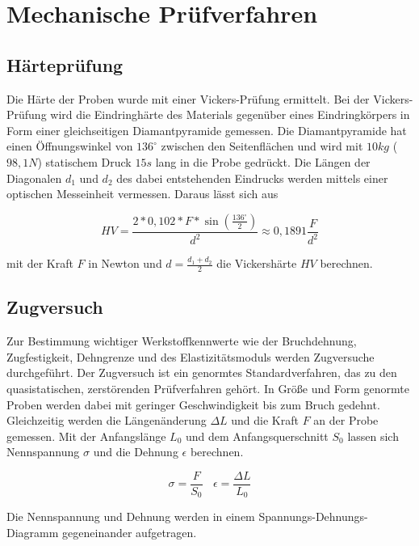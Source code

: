 \section{Mechanische Prüfverfahren}

\subsection{Härteprüfung}

Die Härte der Proben wurde mit einer Vickers-Prüfung ermittelt. Bei der Vickers-Prüfung wird die Eindringhärte des Materials gegenüber eines Eindringkörpers in Form einer gleichseitigen Diamantpyramide gemessen. Die Diamantpyramide hat einen Öffnungswinkel von $136^\circ$ zwischen den Seitenflächen und wird mit $10 kg$ ($98,1 N$) statischem Druck $15 s$ lang in die Probe gedrückt. Die Längen der Diagonalen $d_1$ und $d_2$ des dabei entstehenden Eindrucks werden mittels einer optischen Messeinheit vermessen. Daraus lässt sich aus

\begin{equation}
HV=\frac {2*0,102*F*\sin \left( \frac{136^\circ}{2}\right) } {d^2} \approx 0,1891 \frac{F}{d^2}
	\label{eq:HV}
\end{equation}

mit der Kraft $F$ in Newton und $d=\frac {d_1 + d_2}{2} $ die Vickershärte $HV$ berechnen. 

\subsection{Zugversuch}
Zur Bestimmung wichtiger Werkstoffkennwerte wie der Bruchdehnung, Zugfestigkeit, Dehngrenze und des Elastizitätsmoduls werden Zugversuche durchgeführt. Der Zugversuch ist ein genormtes Standardverfahren, das zu den quasistatischen, zerstörenden Prüfverfahren gehört. In Größe und Form genormte Proben werden dabei mit geringer Geschwindigkeit bis zum Bruch gedehnt. Gleichzeitig werden die Längenänderung $\Delta L$ und die Kraft $F$ an der Probe gemessen. Mit der Anfangslänge $L_0$ und dem Anfangsquerschnitt $S_0$ lassen sich Nennspannung $\sigma$ und die Dehnung $\epsilon$ berechnen.

\begin{equation}
	\sigma=\frac{F}{S_0} ~~~~
	\epsilon=\frac{\Delta L} {L_0}
\end{equation}

Die Nennspannung und Dehnung werden in einem Spannungs-Dehnungs-Diagramm gegeneinander aufgetragen. 